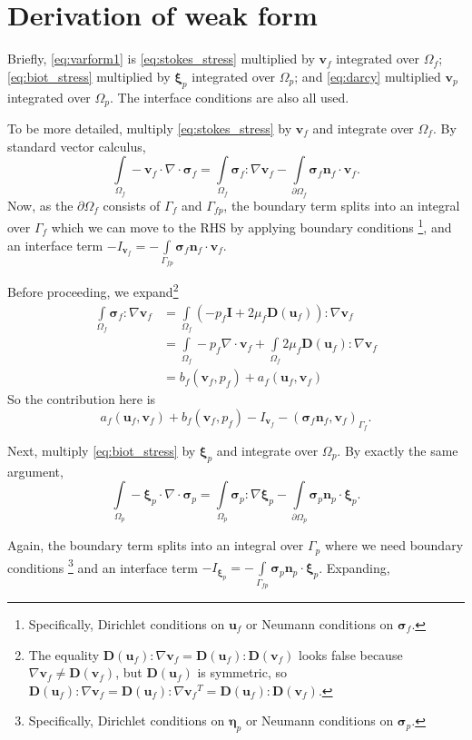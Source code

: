 \documentclass{article}
\newcommand{\mathspace}[1]{\ensuremath{#1}\xspace} %
\newcommand{\D}{\mathspace{\mathbf{D}}}
\newcommand{\sigmabf}{\mathspace{\boldsymbol{\sigma}}}
\newcommand{\grad}{\mathspace{\nabla}}
\renewcommand{\div}{\mathspace{\nabla \cdot}}
\newcommand{\stokes}{\mathspace{\Omega_{f}}}
\newcommand{\stokesbdy}{\mathspace{\Gamma_{f}}}
\newcommand{\darcy}{\mathspace{\Omega_{p}}}
\newcommand{\darcybdy}{\mathspace{\Gamma_{p}}}
\newcommand{\interface}{\mathspace{\Gamma_{fp}}}
\newcommand{\nf}{\mathspace{\mathbf{n}_f}}
\newcommand{\np}{\mathspace{\mathbf{n}_p}}
\newcommand{\intD}{\mathspace{\int \limits_{\darcy}}}
\newcommand{\intDbdyI}{\mathspace{\int \limits_{\partial \darcy}}}
\newcommand{\intS}{\mathspace{\int \limits_{\stokes}}}
\newcommand{\intSbdyI}{\mathspace{\int \limits_{\partial \stokes}}}
\newcommand{\intI}{\mathspace{\int \limits_{\interface}}}
\newcommand{\uf}{\mathspace{\mathbf{u}_f}}
\newcommand{\vf}{\mathspace{\mathbf{v}_f}}
\newcommand{\vp}{\mathspace{\mathbf{v}_p}}
\newcommand{\pf}{\mathspace{p_f}}
\newcommand{\wf}{\mathspace{w_f}}
\newcommand{\disp}{\mathspace{\boldsymbol{\eta}_p}}
\newcommand{\disptest}{\mathspace{\boldsymbol{\xi}_p}}
\begin{document}
\section{Derivation of weak form}
Briefly, \eqref{eq:varform1} is \eqref{eq:stokes_stress} multiplied by \vf integrated over \stokes; \eqref{eq:biot_stress} multiplied by \disptest integrated over \darcy; and \eqref{eq:darcy} multiplied \vp integrated over \darcy. The interface conditions are also all used.

To be more detailed, multiply \eqref{eq:stokes_stress} by \vf and integrate over \stokes. By standard vector calculus,
$$\intS - \vf \cdot \div \sigmabf_f = \intS \sigmabf_f \colon \grad \vf - \intSbdyI \sigmabf_f\nf  \cdot \vf.$$
Now, as the $\partial \stokes$ consists of \stokesbdy and \interface, the boundary term splits into an integral over \stokesbdy which we can move to the RHS by applying boundary conditions \footnote{Specifically, Dirichlet conditions on \uf or Neumann conditions on $\sigmabf_f$.}, and an interface term $-I_{\vf} = -\intI \sigmabf_f \nf \cdot \vf$.

Before proceeding, we expand\footnote{The equality $\D(\uf) \colon \grad \vf = \D(\uf) \colon \D(\vf)$ looks false because $\grad \vf \neq \D(\vf)$, but $\D(\uf)$ is symmetric, so $\D(\uf) \colon \grad \vf = \D(\uf) \colon \grad \vf^T = \D(\uf) \colon \D(\vf)$.}
\begin{align*}
  \intS \sigmabf_f \colon \grad \vf &= \intS (-\pf \mathbf{I} + 2 \mu_f \D(\uf)) \colon \grad \vf \\
                                    &= \intS -\pf \div \vf + \intS 2 \mu_f \D(\uf) \colon \grad \vf \\
                                      &= b_f(\vf, \pf) + a_f(\uf, \vf)
\end{align*}
So the contribution here is $$a_f(\uf, \vf) + b_f(\vf, \pf) -I_{\vf} - (\sigmabf_f\nf, \vf)_{\stokesbdy}.$$



Next, multiply \eqref{eq:biot_stress} by \disptest and integrate over \darcy. By exactly the same argument,
$$\intD - \disptest \cdot \div \sigmabf_p = \intD \sigmabf_p \colon \grad \disptest - \intDbdyI \sigmabf_p\np  \cdot \disptest.$$

Again, the boundary term splits into an integral over \darcybdy where we need boundary conditions \footnote{Specifically, Dirichlet conditions on \disp or Neumann conditions on $\sigmabf_p$.} and an interface term $-I_{\disptest} = -\intI \sigmabf_p \np \cdot \disptest$. Expanding,
\end{document}
